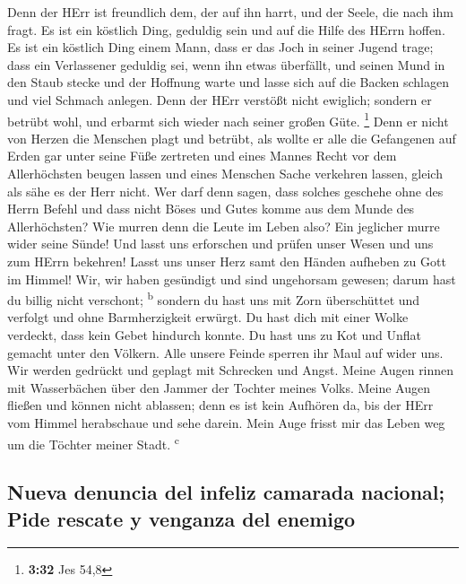  Denn der HErr ist freundlich dem, der auf ihn harrt, und
der Seele, die nach ihm fragt.  Es ist ein köstlich Ding,
geduldig sein und auf die Hilfe des HErrn hoffen.  Es ist
ein köstlich Ding einem Mann, dass er das Joch in seiner Jugend trage;
 dass ein Verlassener geduldig sei, wenn ihn etwas
überfällt,  und seinen Mund in den Staub stecke und der
Hoffnung warte  und lasse sich auf die Backen schlagen
und viel Schmach anlegen.  Denn der HErr verstößt nicht
ewiglich;  sondern er betrübt wohl, und erbarmt sich
wieder nach seiner großen Güte. \footnote{\textbf{3:32} Jes 54,8}
 Denn er nicht von Herzen die Menschen plagt und betrübt,
 als wollte er alle die Gefangenen auf Erden gar unter
seine Füße zertreten  und eines Mannes Recht vor dem
Allerhöchsten beugen lassen  und eines Menschen Sache
verkehren lassen, gleich als sähe es der Herr nicht.  Wer
darf denn sagen, dass solches geschehe ohne des Herrn Befehl
 und dass nicht Böses und Gutes komme aus dem Munde des
Allerhöchsten?  Wie murren denn die Leute im Leben also?
Ein jeglicher murre wider seine Sünde!  Und lasst uns
erforschen und prüfen unser Wesen und uns zum HErrn bekehren!
 Lasst uns unser Herz samt den Händen aufheben zu Gott im
Himmel!  Wir, wir haben gesündigt und sind ungehorsam
gewesen; darum hast du billig nicht verschont; \textsuperscript{b}
 sondern du hast uns mit Zorn überschüttet und verfolgt
und ohne Barmherzigkeit erwürgt.  Du hast dich mit einer
Wolke verdeckt, dass kein Gebet hindurch konnte.  Du hast
uns zu Kot und Unflat gemacht unter den Völkern.  Alle
unsere Feinde sperren ihr Maul auf wider uns.  Wir werden
gedrückt und geplagt mit Schrecken und Angst.  Meine
Augen rinnen mit Wasserbächen über den Jammer der Tochter meines Volks.
 Meine Augen fließen und können nicht ablassen; denn es
ist kein Aufhören da,  bis der HErr vom Himmel
herabschaue und sehe darein.  Mein Auge frisst mir das
Leben weg um die Töchter meiner Stadt. \textsuperscript{c}

\hypertarget{nueva-denuncia-del-infeliz-camarada-nacional-pide-rescate-y-venganza-del-enemigo}{%
\subsection{Nueva denuncia del infeliz camarada nacional; Pide rescate y
venganza del
enemigo}\label{nueva-denuncia-del-infeliz-camarada-nacional-pide-rescate-y-venganza-del-enemigo}}

